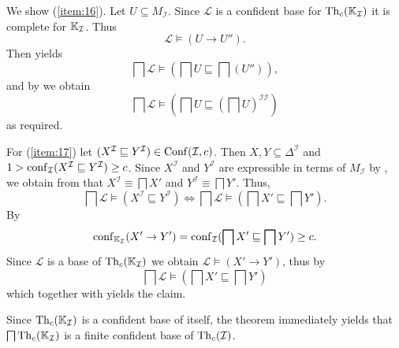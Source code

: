 \begin{Proof}
  We show (\ref{item:16}).  Let $U \subseteq M_{\mathcal{I}}$.  Since $\mathcal{L}$ is a
  confident base for $\operatorname{Th}_c({\mathbb{K}}_{\mathcal{I}})$ it is complete for ${\mathbb{K}}_{\mathcal{I}}$.  Thus
  \begin{equation*}
    \mathcal{L} \models (U \to U'').
  \end{equation*}
  Then  yields
  \begin{equation*}
    \bigsqcap \mathcal{L} \models (\bigsqcap U \sqsubseteq \bigsqcap (U'')),
  \end{equation*}
  and by  we obtain
  \begin{equation*}
    \bigsqcap \mathcal{L} \models (\bigsqcap U \sqsubseteq (\bigsqcap U)^{\mathcal{I}\mathcal{I}})
  \end{equation*}
  as required.

  For (\ref{item:17}) let $(X^{\mathcal{I}} \sqsubseteq Y^{\mathcal{I}}) \in
  \operatorname{Conf}(\mathcal{I}, c)$.  Then $X, Y \subseteq \Delta^{\mathcal{I}}$ and $1 >
  \operatorname{conf}_{\mathcal{I}}(X^{\mathcal{I}} \sqsubseteq Y^{\mathcal{I}}) \ge c$.  Since
  $X^{\mathcal{I}}$ and $Y^{\mathcal{I}}$ are expressible in terms of $M_{\mathcal{I}}$ by
  , we obtain from
   that $X^{\mathcal{I}} \equiv \bigsqcap X'$ and
  $Y^{\mathcal{I}} \equiv \bigsqcap Y'$.  Thus,
  \begin{equation}
    \label{eq:27}
    \bigsqcap \mathcal{L} \models (X^{\mathcal{I}} \sqsubseteq Y^{\mathcal{I}}) \iff
    \bigsqcap \mathcal{L} \models (\bigsqcap X' \sqsubseteq \bigsqcap Y').
  \end{equation}
  By 
  \begin{equation*}
    \operatorname{conf}_{{\mathbb{K}}_{\mathcal{I}}}(X' \to Y') = \operatorname{conf}_{\mathcal{I}}(\bigsqcap X' \sqsubseteq
    \bigsqcap Y') \ge c.
  \end{equation*}
  Since $\mathcal{L}$ is a base of $\operatorname{Th}_c({\mathbb{K}}_{\mathcal{I}})$ we obtain $\mathcal{L}
  \models (X' \to Y')$, thus by 
  \begin{equation*}
    \bigsqcap \mathcal{L} \models (\bigsqcap X' \sqsubseteq \bigsqcap Y')
  \end{equation*}
  which together with  yields the claim.
\end{Proof}

Since $\operatorname{Th}_c({\mathbb{K}}_{\mathcal{I}})$ is a confident base of itself, the theorem immediately
yields that $\bigsqcap \operatorname{Th}_c({\mathbb{K}}_{\mathcal{I}})$ is a finite confident base of
$\operatorname{Th}_c(\mathcal{I})$.

